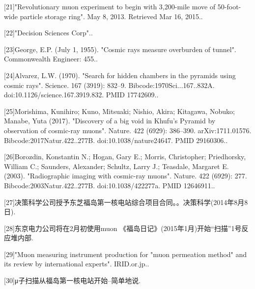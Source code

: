 [21]"Revolutionary muon experiment to begin with 3,200-mile move of 50-foot-wide particle storage ring". May 8, 2013. Retrieved Mar 16, 2015..

[22]"Decision Sciences Corp"..

[23]George, E.P. (July 1, 1955). "Cosmic rays measure overburden of tunnel". Commonwealth Engineer: 455..

[24]Alvarez, L.W. (1970). "Search for hidden chambers in the pyramids using cosmic rays". Science. 167 (3919): 832–9. Bibcode:1970Sci...167..832A. doi:10.1126/science.167.3919.832. PMID 17742609..

[25]Morishima, Kunihiro; Kuno, Mitsuaki; Nishio, Akira; Kitagawa, Nobuko; Manabe, Yuta (2017). "Discovery of a big void in Khufu's Pyramid by observation of cosmic-ray muons". Nature. 422 (6929): 386–390. arXiv:1711.01576. Bibcode:2017Natur.422..277B. doi:10.1038/nature24647. PMID 29160306..

[26]Borozdin, Konstantin N.; Hogan, Gary E.; Morris, Christopher; Priedhorsky, William C.; Saunders, Alexander; Schultz, Larry J.; Teasdale, Margaret E. (2003). "Radiographic imaging with cosmic-ray muons". Nature. 422 (6929): 277. Bibcode:2003Natur.422..277B. doi:10.1038/422277a. PMID 12646911..

[27]决策科学公司授予东芝福岛第一核电站综合项目合同。。决策科学(2014年8月8日).

[28]东京电力公司将在2月初使用muon 《福岛日记》(2015年1月)开始“扫描”1号反应堆内部.

[29]"Muon measuring instrument production for "muon permeation method" and its review by international experts". IRID.or.jp..

[30]μ子扫描从福岛第一核电站开始–简单地说.